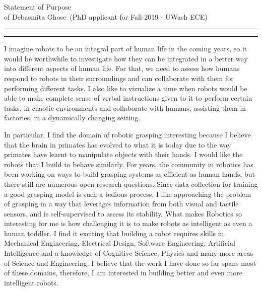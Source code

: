 \documentclass[10pt]{article}
\newcommand{\soptitle}{Statement of Purpose}
\newcommand{\yourname}{Debasmita Ghose}
\begin{document}
\begin{center}\LARGE\soptitle\\
\large of \yourname\ (PhD applicant for Fall-2019 - UWash ECE)
\end{center}

\hrule
\vspace{0pt}
\hrule height 1pt

\bigskip

I imagine robots to be an integral part of human life in the coming years, so it would be worthwhile to investigate how they can be integrated in a better way into different aspects of human life. For that, we need to assess how humans respond to robots in their surroundings and can collaborate with them for performing different tasks. I also like to vizualize a time when robots would be able to make complete sense of verbal instructions given to it to perform certain tasks, in chaotic environments and collaborate with humans, assisting them in factories, in a dynamically changing setting.
\par
  In particular, I find the domain of robotic grasping interesting because I believe that the brain in primates has evolved to what it is today due to the way primates have learnt to manipulate objects with their hands. I would like the robots that I build to behave similarly. For years, the community in robotics has been working on ways to build grasping systems as efficient as  human hands, but there still are numerous open research questions. Since data collection for training a good grasping model is such a tedious process,  I like approaching the problem of grasping in a way that leverages information from both visual and tactile sensors, and is self-supervised to assess its stability. What makes Robotics so interesting for me is how challenging it is to make robots as intelligent as even a human toddler. I find it exciting that building a robot requires skills in Mechanical Engineering, Electrical Design, Software Engineering, Artificial Intelligence and a knowledge of Cognitive Science, Physics and many more areas of Science and Engineering. I believe that the work I have done so far spans most of these domains, therefore, I am interested in building better and even more intelligent robots.    
\par
\end{document}

